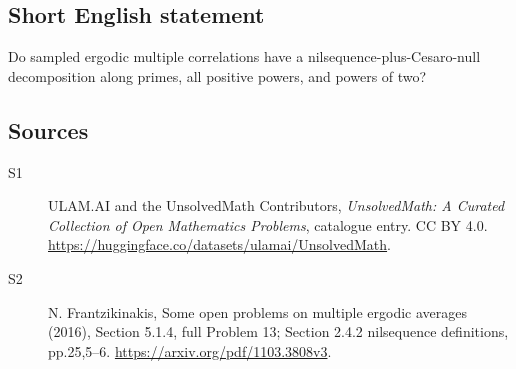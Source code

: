 \documentclass[11pt]{article}
\begin{document}
\subsection{Short English statement}
Do sampled ergodic multiple correlations have a nilsequence-plus-Cesaro-null decomposition along primes, all positive powers, and powers of two?
\subsection{Sources}
\begin{description}
\item[\hypertarget{source:statement:1}{S1}] ULAM.AI and the UnsolvedMath Contributors, \emph{UnsolvedMath: A Curated Collection of Open Mathematics Problems}, catalogue entry. CC BY 4.0. \url{https://huggingface.co/datasets/ulamai/UnsolvedMath}.
\item[\hypertarget{source:statement:2}{S2}] N. Frantzikinakis, Some open problems on multiple ergodic averages (2016), Section 5.1.4, full Problem 13; Section 2.4.2 nilsequence definitions, pp.25,5--6. \url{https://arxiv.org/pdf/1103.3808v3}.
\end{description}
\label{end:statement}
\end{document}

